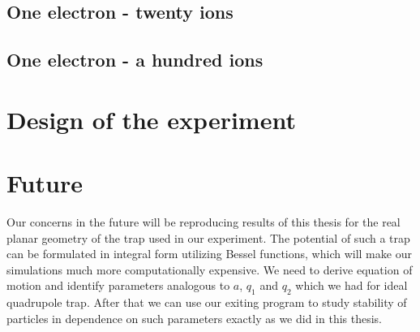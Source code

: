 \subsection{One electron - twenty ions}
\subsection{One electron - a hundred ions}

\section{Design of the experiment}

\section{Future}
\label{chap:future}

Our concerns in the future will be reproducing results of this thesis for the real planar geometry of the trap used in our experiment. The potential of such a trap can be formulated in integral form utilizing Bessel functions, which will make our simulations much more computationally expensive. We need to derive equation of motion and identify parameters analogous to $a$, $q_1$ and $q_2$ which we had for ideal quadrupole trap. After that we can use our exiting program to study stability of particles in dependence on such parameters exactly as we did in this thesis. 